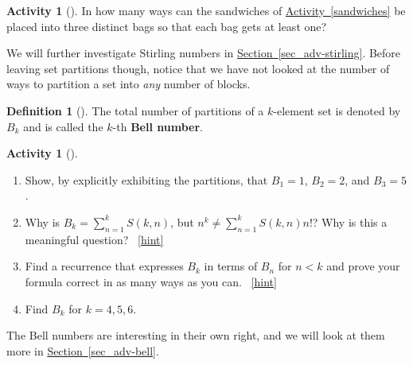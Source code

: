 \documentclass[10pt,]{book}
\newcommand{\terminology}[1]{\textbf{#1}}
\theoremstyle{plain}
\theoremstyle{definition}
\newtheorem{definition}[theorem]{Definition}
\theoremstyle{definition}
\theoremstyle{definition}
\newtheorem{activity}[project]{Activity}
\numberwithin{equation}{chapter}
\newcommand{\lt}{<}
\begin{document}
\begin{activity}[]\label{activity-198}
\hypertarget{p-1107}{}%
In how many ways can the sandwiches of \hyperref[sandwiches]{Activity~\ref{sandwiches}} be placed into three distinct bags so that each bag gets at least one?%
\end{activity}
\hypertarget{p-1109}{}%
We will further investigate Stirling numbers in \hyperref[sec_adv-stirling]{Section~\ref{sec_adv-stirling}}.  Before leaving set partitions though, notice that we have not looked at the number of ways to partition a set into \emph{any} number of blocks.%
\begin{definition}[{}]\label{def-bell}
\hypertarget{p-1110}{}%
The total number of partitions of a \(k\)-element set is denoted by \(B_k\) and is called the \(k\)-th \terminology{Bell number}.%
\end{definition}
\begin{activity}[]\label{BellNumberIntro}
\leavevmode%
\begin{enumerate}[font=\bfseries,label=(\alph*),ref=\alph*]
\item\label{task-215} \hypertarget{p-1111}{}%
Show, by explicitly exhibiting the partitions, that \(B_1 = 1\), \(B_2 = 2\), and \(B_3 = 5\).%
\item\label{task-216} \hypertarget{p-1113}{}%
Why is \(B_k = \sum_{n=1}^{k} S(k,n)\), but \(n^k \ne \sum_{n=1}^k S(k,n)n!\)?  Why is this a meaningful question?%
~\hfill{\tiny\hyperlink{a-206.b}{[hint]}\hypertarget{q-206.b}{}}\item\label{task-217} \hypertarget{p-1115}{}%
Find a recurrence that expresses \(B_k\) in terms of \(B_n\) for \(n\lt  k\) and prove your formula correct in as many ways as you can.%
~\hfill{\tiny\hyperlink{a-206.c}{[hint]}\hypertarget{q-206.c}{}}\item\label{task-218} \hypertarget{p-1119}{}%
Find \(B_k\) for \(k=4,5,6\).%
\end{enumerate}
\end{activity}
\hypertarget{p-1121}{}%
The Bell numbers are interesting in their own right, and we will look at them more in \hyperref[sec_adv-bell]{Section~\ref{sec_adv-bell}}.%
\typeout{************************************************}
\typeout{************************************************}
\end{document}
